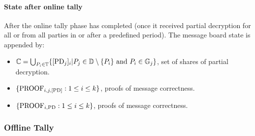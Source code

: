 \documentclass[runningheads]{llncs}
\begin{document}
\paragraph{State after online tally}

After the online tally phase has completed (once it received partial decryption for all \SetOfEncryptedPartialDecryptionKeys{} or from all parties in \SetOfFDKG{} or after a predefined period). The message board state is appended by:
\begin{itemize}
    \item $\mathbb{C} = \bigcup_{P_i \in \mathbb{T}} \{ [\mathrm{PD}_{j}]_{i} | P_{j} \in \mathbb{D} \setminus \{P_{i}\} \text{ and } P_{i} \in \mathbb{G}_{j}\}$, set of shares of partial decryption.
    \item $\{\textrm{PROOF}_{i,j,\textrm{[PD]}} : 1 \leq i \leq k\}$, proofs of message correctness. %
    \item $\{\textrm{PROOF}_{i,\textrm{PD}} : 1 \leq i \leq k\}$, proofs of message correctness. %
\end{itemize}

\subsubsection{Offline Tally}
\end{document}
